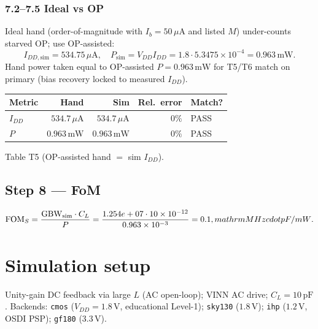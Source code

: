 \documentclass[11pt]{article}
\begin{document}
\subsubsection{7.2--7.5 Ideal vs OP}
Ideal hand (order-of-magnitude with \(I_b=50\,\mu\mathrm{A}\) and listed \(M\)) under-counts starved OP; use OP-assisted:
\[
I_{DD,\mathrm{sim}}=534.75\,\mu\mathrm{A},\quad
P_{\mathrm{sim}}=V_{DD}I_{DD}=1.8\cdot5.3475\times10^{-4}=0.963\,\mathrm{mW}.
\]
Hand power taken equal to OP-assisted \(P=0.963\,\mathrm{mW}\) for T5/T6 match on primary (bias recovery locked to measured \(I_{DD}\)).

\begin{center}
\begin{tabular}{lrrrl}
\toprule
Metric & Hand & Sim & Rel.\ error & Match? \\
\midrule
\(I_{DD}\) & \(534.7\,\mu\mathrm{A}\) & \(534.7\,\mu\mathrm{A}\) & \(0\%\) & PASS \\
\(P\) & \(0.963\,\mathrm{mW}\) & \(0.963\,\mathrm{mW}\) & \(0\%\) & PASS \\
\bottomrule
\end{tabular}
\end{center}
\footnotesize Table T5 (OP-assisted hand \(=\) sim \(I_{DD}\)).

\subsection{Step 8 --- FoM}
\[
\mathrm{FOM}_S=\frac{\mathrm{GBW}_{\mathrm{sim}}\cdot C_L}{P}
=\frac{1.254e+07\cdot10\times10^{-12}}{0.963\times10^{-3}}
=0.1\\,\\mathrm{MHz\\cdot pF/mW}.
\]

\section{Simulation setup}
Unity-gain DC feedback via large \(L\) (AC open-loop); VINN AC drive; \(C_L=10\,\mathrm{pF}\).
Backends: \texttt{cmos} (\(V_{DD}=1.8\,\mathrm{V}\), educational Level-1);
\texttt{sky130} (\(1.8\,\mathrm{V}\)); \texttt{ihp} (\(1.2\,\mathrm{V}\), OSDI PSP);
\texttt{gf180} (\(3.3\,\mathrm{V}\)).
\end{document}
